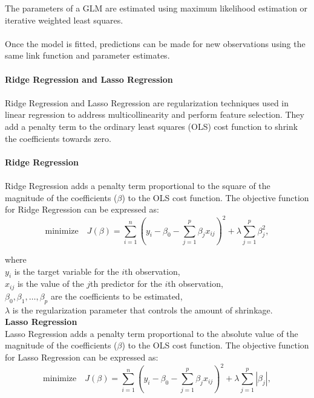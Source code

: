 \documentclass[12pt]{article}
\begin{document}
\noindent The parameters of a GLM are estimated using maximum likelihood estimation or iterative weighted
least squares.\\
\\
Once the model is fitted, predictions can be made for new observations using the same
link function and parameter estimates.\\
\\
\textbf{Ridge Regression and Lasso Regression}\\
\\
Ridge Regression and Lasso Regression are regularization techniques used in linear regression
to address multicollinearity and perform feature selection. They add a penalty term to the
ordinary least squares (OLS) cost function to shrink the coefficients towards zero.\\
\\
\textbf{Ridge Regression}\\
\\
Ridge Regression adds a penalty term proportional to the square of the magnitude of the
coefficients (\(\beta\)) to the OLS cost function. The objective function for Ridge Regression
can be expressed as:\\

\begin{equation}
    \text{minimize} \quad J(\beta) = \sum_{i=1}^{n} (y_i - \beta_0 - \sum_{j=1}^{p} \beta_j x_{ij})^2 + \lambda \sum_{j=1}^{p} \beta_j^2,
\end{equation}

\noindent where\\
\(y_i\) is the target variable for the \(i\)th observation,\\
\(x_{ij}\) is the value of the \(j\)th predictor for the \(i\)th observation,\\
\(\beta_0, \beta_1, \ldots, \beta_p\) are the coefficients to be estimated,\\
\(\lambda\) is the regularization parameter that controls the amount of shrinkage.\\

\noindent
\textbf{Lasso Regression}\\
Lasso Regression adds a penalty term proportional to the absolute value of the
magnitude of the coefficients (\(\beta\)) to the OLS cost function. The objective
function for Lasso Regression can be expressed as:\\

\begin{equation}
    \text{minimize} \quad J(\beta) = \sum_{i=1}^{n} (y_i - \beta_0 - \sum_{j=1}^{p} \beta_j x_{ij})^2 + \lambda \sum_{j=1}^{p} |\beta_j|,
\end{equation}
\end{document}
